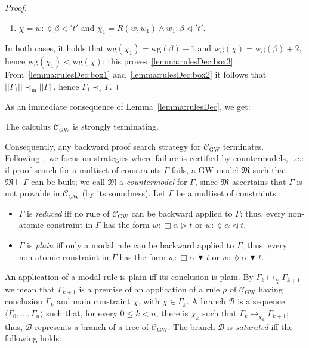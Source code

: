 \documentclass[copyright,creativecommons]{eptcs}
\newcommand{\GWM}{\mbox{$\mathrm{GW}$}}
\newcommand{\Calcw}{\Ccal_{\mathrm{GW}}}
\newcommand{\Diam}{\lozenge}
\newcommand{\precm}{\prec_{\mathrm{m}}}
\newcommand{\precc}{\prec_{\mathrm{c}}}
\newcommand{\gt}{\rhd}
\newcommand{\lt}{\lhd}
\newcommand{\stru}[1]{\langle #1 \rangle} %
\newcommand{\abstractorder}{\,\blacktriangledown\,}%
\newcommand{\sizem}[1]{||#1||}
\newcommand{\wg}[1]{\mathrm{wg}(#1)}
\newcommand{\app}[3]{#2\mapsto_{#1} #3}
\newcommand{\M}{\mathfrak{M}}
\renewcommand{\a}{\alpha}
\renewcommand{\b}{\beta}
\newcommand{\G}{\Gamma}
\newcommand{\Bcal}{\mathcal{B}}
\newcommand{\Ccal}{\mathcal{C}}
\begin{document}
\begin{proof}
\begin{enumerate}[label=(\alph*), ref=(\alph*),leftmargin=*]
\item\label{lemma:rulesDec:box3b}
  $\chi = w:\Diam \b \lt' t'$ and $\chi_1 = R(w,w_1)\land w_1 : \b \lt' t'$.
\end{enumerate}
In both cases, it holds that $\wg{\chi_1}= \wg{\b} +1$ and $\wg{\chi}=
\wg{\b} +2$, hence $\wg{\chi_1} < \wg{\chi}$; this
proves~\ref{lemma:rulesDec:box3}.  From~\ref{lemma:rulesDec:box1}
and~\ref{lemma:rulesDec:box2} it follows that $\sizem{\G_1}\precm
\sizem{\G}$, hence $\G_1\precc \G$.
\end{proof}



As an immediate consequence of Lemma~\ref{lemma:rulesDec}, we get:

\begin{proposition}\label{prop:term}
  The calculus $\Calcw$ is strongly terminating.
\end{proposition}

Consequently, any backward proof search strategy for $\Calcw$
terminates.  Following~\cite{FerFioFio:2013,FioFer:2021jlc}, we focus
on strategies where failure is certified by countermodels, i.e.: if
proof search for a multiset of constraints $\G$ fails, a \GWM-model
$\M$ such that $\M\models \G$ can be built; we call $\M$ a
\emph{countermodel} for $\G$, since $\M$ ascertains that $\G$ is not
provable in $\Calcw$ (by its soundness).  Let $\G$ be a multiset of
constraints:

\begin{itemize}
\item $\G$ is \emph{reduced} iff no rule of $\Calcw$ can be backward
  applied to $\G$; thus, every non-atomic constraint in $\G$ has the
  form $w:\Box \a \gt t$ or $w:\Diam \a \lt t$.

\item $\G$ is \emph{plain} iff only a modal rule can be backward
  applied to $\G$; thus, every non-atomic constraint in $\G$ has the
  form $w:\Box \a \abstractorder t$ or $w:\Diam \a \abstractorder t$.
\end{itemize}
An application of a modal rule is plain iff its conclusion is plain.
By $\app{\chi}{\G_k}{\G_{k+1}}$ we mean that $\G_{k+1}$ is a premise
of an application of a rule $\rho$ of $\Calcw$ having conclusion
$\G_k$ and main constraint $\chi$, with $\chi\in\G_k$.  A branch
$\Bcal$ is a sequence $\stru{\G_0,\dots,\G_n}$ such that, for every $0
\leq k < n$, there is $\chi_k$ such that
$\app{\chi_k}{\G_k}{\G_{k+1}}$; thus, $\Bcal$ represents a branch of a
tree of $\Calcw$.  The branch $\Bcal$ is \emph{saturated} iff the
following holds:
\end{document}
